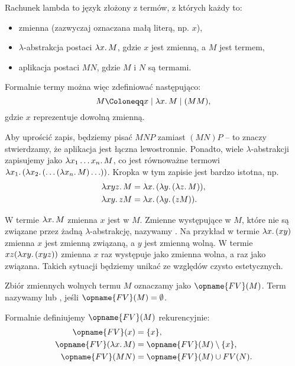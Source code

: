 \documentclass[polish,pretty]{angav}
\newcommand{\FV}{\opname{FV}}
\begin{document}
Rachunek lambda to język złożony z termów, z których każdy to:
\begin{itemize}
    \item zmienna (zazwyczaj oznaczana małą literą, np. $x$),
    \item $\lambda$-abstrakcja postaci $\lambda x\ldotp M$, gdzie $x$ jest zmienną, a $M$ jest termem,
    \item aplikacja postaci $MN$, gdzie $M$ i $N$ są termami.
\end{itemize}

Formalnie termy można więc zdefiniować następująco:
\[ M \Coloneqq x \mid \lambda x\ldotp M \mid (MM), \]
gdzie $x$ reprezentuje dowolną zmienną.

Aby uprościć zapis, będziemy pisać $MNP$ zamiast $(MN)P$ -- to znaczy stwierdzamy, że aplikacja jest łączna lewostronnie. Ponadto, wiele $\lambda$-abstrakcji zapisujemy jako $\lambda x_1 \ldots x_n\ldotp M$, co jest równoważne termowi $\lambda x_1\ldotp (\lambda x_2\ldotp (\ldots (\lambda x_n\ldotp M) \ldots))$. Kropka w tym zapisie jest bardzo istotna, np.
\begin{align*}
    \lambda xyz\ldotp M &= \lambda x\ldotp (\lambda y\ldotp (\lambda z\ldotp M)), \\
    \lambda xy\ldotp z M &= \lambda x\ldotp (\lambda y\ldotp (z M)).
\end{align*}

W termie $\lambda x\ldotp M$ zmienna $x$ jest  w $M$.
Zmienne występujące w $M$, które nie są związane przez żadną $\lambda$-abstrakcję, nazywamy .
Na przykład w termie $\lambda x\ldotp (x y)$ zmienna $x$ jest zmienną związaną, a $y$ jest zmienną wolną.
W termie $xz(\lambda xy\ldotp (xyz))$ zmienna $x$ raz występuje jako zmienna wolna, a raz jako związana. Takich sytuacji będziemy unikać ze względów czysto estetycznych.

Zbiór zmiennych wolnych termu $M$ oznaczamy jako $\FV(M)$.
Term nazywamy  lub , jeśli $\FV(M) = \emptyset$.

\begin{remark}
    Formalnie definiujemy $\FV(M)$ rekurencyjnie:
    \begin{align*}
        \FV(x) &= \{x\}, \\
        \FV(\lambda x\ldotp M) &= \FV(M) \setminus \{x\}, \\
        \FV(MN) &= \FV(M) \cup FV(N).
    \end{align*}
\end{remark}
\end{document}
